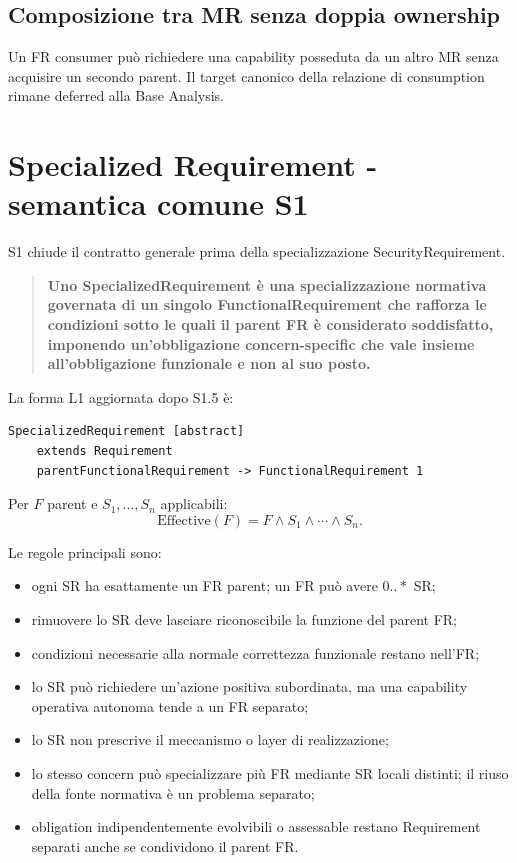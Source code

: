 \documentclass[12pt,a4paper,oneside]{report}
\begin{document}
\subsection{Composizione tra MR senza doppia ownership}

Un FR consumer può richiedere una capability posseduta da un altro MR senza acquisire un secondo parent. Il target canonico della relazione di consumption rimane deferred alla Base Analysis.

\section{Specialized Requirement - semantica comune S1}

S1 chiude il contratto generale prima della specializzazione SecurityRequirement.

\begin{quote}
\textbf{Uno SpecializedRequirement è una specializzazione normativa governata di un singolo FunctionalRequirement che rafforza le condizioni sotto le quali il parent FR è considerato soddisfatto, imponendo un'obbligazione concern-specific che vale insieme all'obbligazione funzionale e non al suo posto.}
\end{quote}

La forma L1 aggiornata dopo S1.5 è:
\begin{lstlisting}
SpecializedRequirement [abstract]
    extends Requirement
    parentFunctionalRequirement -> FunctionalRequirement 1
\end{lstlisting}

Per $F$ parent e $S_1,\dots,S_n$ applicabili:
\[
\mathrm{Effective}(F)=F\land S_1\land\cdots\land S_n.
\]

Le regole principali sono:
\begin{itemize}
  \item ogni SR ha esattamente un FR parent; un FR può avere $0..*$ SR;
  \item rimuovere lo SR deve lasciare riconoscibile la funzione del parent FR;
  \item condizioni necessarie alla normale correttezza funzionale restano nell'FR;
  \item lo SR può richiedere un'azione positiva subordinata, ma una capability operativa autonoma tende a un FR separato;
  \item lo SR non prescrive il meccanismo o layer di realizzazione;
  \item lo stesso concern può specializzare più FR mediante SR locali distinti; il riuso della fonte normativa è un problema separato;
  \item obligation indipendentemente evolvibili o assessable restano Requirement separati anche se condividono il parent FR.
\end{itemize}
\end{document}
